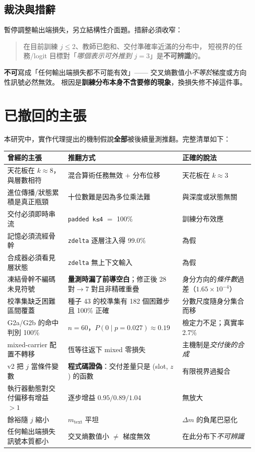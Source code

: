\documentclass[11pt, a4paper]{article}
\begin{document}
\subsection{裁決與措辭}

暫停調整輸出端損失，另立結構性介面題。措辭必須收窄：

\begin{quote}
在目前訓練 $j \leq 2$、教師已飽和、交付準確率近滿的分布中，
短視界的任務/logit 目標對「\emph{哪個表示可外推到 $j{=}3$}」是\textbf{不可辨識}的。
\end{quote}

\textbf{不可}寫成「任何輸出端損失都不可能有效」—— 交叉熵數值小\emph{不等於}梯度或方向性訊號必然無效。
根因是\textbf{訓練分布本身不含要修的現象}，換損失修不掉這件事。

\section{已撤回的主張}\label{sec:retract}

本研究中，實作代理提出的機制假說\textbf{全部}被後續量測推翻。完整清單如下：

\begin{longtable}{p{} p{} p{}}
\toprule
\textbf{曾經的主張} & \textbf{推翻方式} & \textbf{正確的說法} \\
\midrule
\endhead
天花板在 $k \approx 8$，與層數相符 & 混合算術任務無效 $+$ 分布位移 & 天花板在 $k \approx 3$ \\
進位傳播/狀態累積是真正瓶頸 & 十位數難是因為多位乘法難 & 與深度或狀態無關 \\
交付必須即時串流 & \verb|padded k≤4| $=$ 100\% & 訓練分布效應 \\
記憶必須流經骨幹 & \verb|zdelta| 逐層注入得 99.0\% & 為假 \\
合成器必須看見層狀態 & \verb|zdelta| 無上下文輸入 & 為假 \\
凍結骨幹不編碼未見符號 & \textbf{量測時漏了前導空白}；修正後 28 對$\to$7 對且非精確重疊 & 身分方向的\emph{條件數}過差（$1.65\times10^{-4}$）\\
校準集缺乏困難區間覆蓋 & 種子 43 的校準集有 182 個困難步且 100\% 正確 & 分數尺度隨身分集合而移 \\
G2a/G2b 的命中判別 100\% & $n{=}60$，$P(0 \mid p{=}0.027) \approx 0.19$ & 檢定力不足；真實率 2.7\% \\
mixed-carrier 配置不轉移 & 恆等往返下 mixed 零損失 & 主機制是\emph{交付後的合成} \\
v2 把 $j$ 當條件變數 & \textbf{程式碼證偽}：交付差量只是 (slot, $z$) 的函數 & 有限視界過擬合 \\
執行器動態對交付偏移有增益 $>1$ & 逐步增益 $0.95/0.89/1.04$ & 無放大 \\
餘裕隨 $j$ 縮小 & $m_{\text{text}}$ 平坦 & $\Delta m$ 的負尾巴惡化 \\
任何輸出端損失訊號本質都小 & 交叉熵數值小 $\neq$ 梯度無效 & 在此分布下\emph{不可辨識} \\
\bottomrule
\end{longtable}
\end{document}
